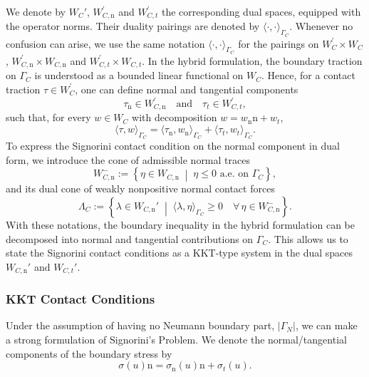We denote by $W_C'$, $W_{C,\mathrm{n}}^\prime$ and $W_{C,t}^\prime$ the corresponding dual spaces, equipped with the operator norms. Their duality pairings are denoted by $\langle \cdot,\cdot\rangle_{\Gamma_C}$. Whenever no confusion can arise, we use the same notation $\langle\cdot,\cdot\rangle_{\Gamma_C}$ for the pairings on
$W_C^\prime\times W_C$, $W_{C,\mathrm{n}}^\prime\times W_{C,\mathrm{n}}$ and $W_{C,t}^\prime\times W_{C,t}$. In the hybrid formulation, the boundary traction on $\Gamma_C$ is understood as a bounded linear functional on $W_C$.
Hence, for a contact traction $\tau\in W_C^\prime$, one can define normal and tangential components
\begin{equation}\label{eq:traction_split_dual}
	\tau_\mathrm{n}\in W_{C,\mathrm{n}}^\prime
	\quad\text{and}\quad
	\tau_t\in W_{C,t}^\prime,
\end{equation}
such that, for every $w\in W_C$ with decomposition $w=w_\mathrm{n}\mathrm n+w_t$,
\begin{equation}\label{eq:dual_split_pairing}
	\langle \tau,w\rangle_{\Gamma_C}
	=
	\langle \tau_\mathrm{n},w_\mathrm{n}\rangle_{\Gamma_C}
	+
	\langle \tau_t,w_t\rangle_{\Gamma_C}.
\end{equation}
To express the Signorini contact condition on the normal component in dual form, we introduce the cone of admissible normal traces
\begin{equation}\label{eq:cone_WCn_minus}
	W_{C,\mathrm{n}}^-
	:=
	\left\{\eta\in W_{C,\mathrm{n}}\; \middle|\; \eta\le 0 \text{ a.e.\ on }\Gamma_C\right\},
\end{equation}
and its dual cone of weakly nonpositive normal contact forces
\begin{equation}\label{eq:def_LambdaC}
	\Lambda_C
	:=
	\left\{\lambda\in W_{C,\mathrm{n}}'\; \middle|\; \langle \lambda,\eta\rangle_{\Gamma_C} \ge 0 \quad \forall\,\eta\in W_{C,\mathrm{n}}^-\right\}.
\end{equation}
With these notations, the boundary inequality in the hybrid formulation can be decomposed into normal and tangential contributions on $\Gamma_C$.
This allows us to state the Signorini contact conditions as a KKT-type system in the dual spaces $W_{C,\mathrm{n}}'$ and $W_{C,t}'$.

\subsubsection{KKT Contact Conditions}

Under the assumption of having no Neumann boundary part, $|\Gamma_N|$, we can make a strong formulation of Signorini's Problem. We denote the normal/tangential components of the boundary stress by
\begin{equation*}
	\sigma(u)\mathrm{n} = \sigma_\mathrm{n}(u)\mathrm{n}+\sigma_t(u).
\end{equation*}

